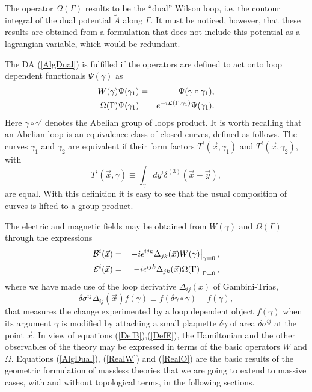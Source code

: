 \documentclass[a4paper,12pt]{article}
\newcommand{\eref}[1]{(\ref{#1})}
\renewcommand{\sup}[1]{^{(#1)}}
\newcommand{\dtxy}{\delta\sup 3(\vec x-\vec y)}
\begin{document}
The operator $\Omega (\Gamma)$ results to be the ``dual'' Wilson loop, i.e.
the contour integral of the dual potential $\tilde A$ along
$\Gamma$\cite{AlgNL-Maxwell}. It must be noticed, however, that these results
are obtained from a formulation that does not include this potential as a
lagrangian variable, which would be redundant.

The DA \eref{AlgDual} is fulfilled if the operators are defined to act onto
loop dependent functionals $\Psi(\gamma)$ as
\begin{eqnarray}
W(\gamma)\Psi(\gamma_1)&=&\Psi({\gamma}\circ{\gamma_1}), \label{RealW} \\
\Omega(\Gamma)\Psi(\gamma_1)&=&e^{-i{\cal L}(\Gamma,\gamma_1)}\Psi(\gamma_1).
\label{RealO}
\end{eqnarray}
Here ${\gamma}\circ{\gamma}'$ denotes the Abelian group of loops
product\cite{GT-em,NC:Max}. It is worth recalling that an Abelian
loop is an equivalence class of closed curves, defined as
follows. The curves $\gamma_1$ and $\gamma_2$ are equivalent if
their form factors $T^i(\vec x,\gamma_1)$ and $T^i(\vec x,\gamma_2)$, with
\begin{equation}
T^i(\vec x,\gamma)\equiv\int_\gamma dy^i\dtxy,
\end{equation}
are equal. With this definition it is easy to see that the usual composition
of curves is lifted to a group product.

The electric and magnetic fields may be obtained from $W(\gamma)$ and
$\Omega(\Gamma)$ through the expressions
\begin{eqnarray}
{\cal B}^i(\vec x)&=&\left.-i\epsilon^{ijk}\Delta_{jk}(\vec x)W(\gamma)
\right|_{\gamma=0},\label{DefB}\\
{\cal E}^i(\vec x)&=&\left.-i\epsilon^{ijk}\Delta_{jk}(\vec x)
\Omega(\Gamma)\right|_{\Gamma=0},\label{DefE}
\end{eqnarray}
where we have made use of the loop derivative $\Delta_{ij}(x)$ of
Gambini-Trias\cite{GT-em},
\begin{equation}
\delta\sigma^{ij}\Delta_{ij}(\vec x)f(\gamma)\equiv
f(\delta\gamma\circ\gamma)-f(\gamma)\label{LD},
\end{equation}
that measures the change experimented by a loop dependent object $f(\gamma)$
when its argument $\gamma$ is modified by attaching a small plaquette
$\delta\gamma$ of area $\delta\sigma^{ij}$ at the point $\vec x$. In view of
equations \eref{DefB},\eref{DefE}, the Hamiltonian and the other observables
of the theory may be expressed in terms of the basic operators $W$ and
$\Omega$. Equations \eref{AlgDual}, \eref{RealW} and \eref{RealO} are the
basic results of the geometric formulation of massless theories that we are
going to extend to massive cases, with and without topological terms, in the
following sections.
\end{document}
